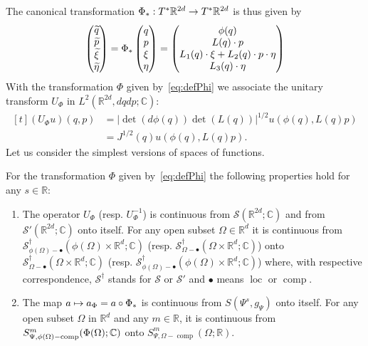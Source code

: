\documentclass[AHL,Unicode,longabstracts]{cedram}
\newcommand{\C}{\mathbb{C}}
\newcommand{\R}{\mathbb{R}}
\newcommand{\clS}{\mathcal{S}}
\newcommand{\p}{\partial}
\DeclareMathOperator{\ccomp}{comp}
\DeclareMathOperator{\locc}{loc}
\newcommand*{\relabel}{\renewcommand{\labelenumi}{(\theenumi)}}
\newcommand*{\romanenumi}{\renewcommand*{\theenumi}{\roman{enumi}}\relabel}
\let\oldtilde\tilde
\renewcommand*{\tilde}[1]{\mathchoice{\widetilde{#1}}{\widetilde{#1}}{\oldtilde{#1}}{\oldtilde{#1}}}
\renewcommand*{\to}{\mathchoice{\longrightarrow}{\rightarrow}{\rightarrow}{\rightarrow}}
\let\oldmapsto\mapsto
\renewcommand*{\mapsto}{\mathchoice{\longmapsto}{\oldmapsto}{\oldmapsto}{\oldmapsto}}
\begin{document}
The canonical transformation $\Phi_{*}:T^{*}\R^{2d}\to T^{*}\R^{2d}$ is thus given by
\[
\begin{pmatrix}
\tilde{q}\\
\tilde{p}\\
\tilde{\xi}\\
\tilde{\eta}
\end{pmatrix} =\Phi_{*}
\begin{pmatrix}
q\\p\\\xi\\\eta
\end{pmatrix} =
\begin{pmatrix}
\phi(q)\\
L(q)\cdot p\\
L_{1}(q)\cdot\xi+L_{2}(q)\cdot p\cdot\eta\\
L_{3}(q)\cdot\eta
\end{pmatrix}
\]
With the transformation $\Phi$ given by~\eqref{eq:defPhi} we associate the unitary transform $U_{\Phi}$ in $L^{2}(\R^{2d},dqdp;\C)$:
\begin{equation}\label{eq:defUPsi}
\begin{aligned}[t]
(U_{\Phi}u)(q,p)&=\lvert\det(d\phi(q))\det(L(q))|^{1/2}u(\phi(q),L(q)p)\\
&=J^{1/2}(q)u(\phi(q),L(q)p).
\end{aligned}
\end{equation}
Let us consider the simplest versions of spaces of functions.
\begin{prop}\label{pr:invfunc}
For the transformation $\Phi$ given by~\eqref{eq:defPhi} the following properties hold for any $s\in \R$:
\begin{enumerate}\romanenumi
\item\label{propE.12.1} The operator $U_{\Phi}$ (resp. $U_{\Phi}^{-1}$) is continuous from $\clS(\R^{2d};\C)$ and from\linebreak $\clS'(\R^{2d};\C)$ onto itself. For any open subset $\Omega\in \R^{d}$ it is continuous from $\clS^{\dagger}_{\phi(\Omega)-\bullet}(\phi(\Omega)\times \R^{d};\C)$ (resp. $\clS^{\dagger}_{\Omega-\bullet}(\Omega\times \R^{d};\C)$) onto $\clS^{\dagger}_{\Omega-\bullet}(\Omega\times \R^{d};\C)$ (resp. $\clS^{\dagger}_{\phi(\Omega)-\bullet}(\phi(\Omega)\times \R^{d};\C)$) where, with respective correspondence, $\clS^{\dagger}$ stands for $\clS$ or $\clS'$ and ${\bullet}$ means $\locc$ or $\ccomp$.
\item\label{propE.12.2} The map $a\mapsto a_{\Phi}=a\circ \Phi_{*}$ is continuous from $S(\Psi^{s},g_{\Psi})$ onto itself. For any open subset $\Omega$ in $\R^{d}$ and any $m\in \R$, it is continuous from $S^{m}_{\Psi,\phi(\Omega)-\ccomp}(\Phi(\Omega);\linebreak\C)$ onto $S^{m}_{\Psi,\Omega-\ccomp}(\Omega;\R)$.
\end{enumerate}
\end{prop}
\end{document}

